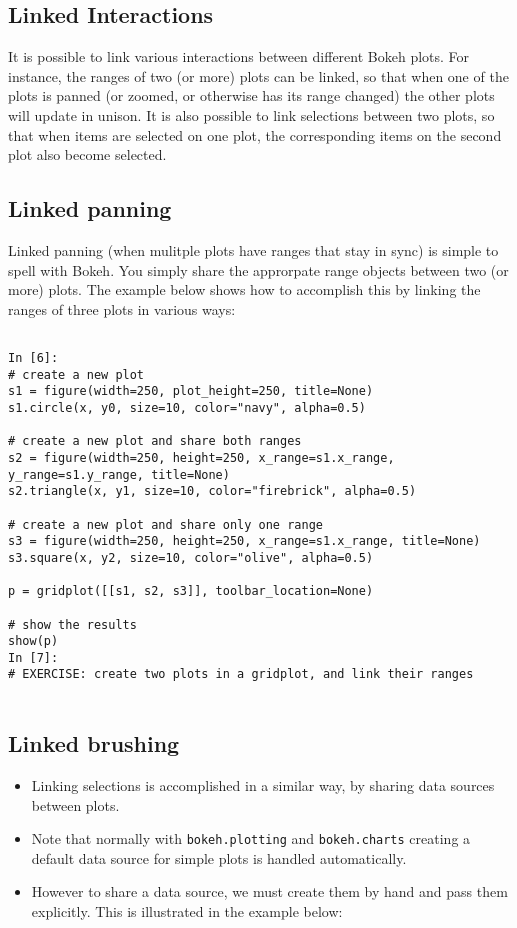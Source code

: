 \documentclass[a4paper,12pt]{article}
\begin{document}
\subsection{Linked Interactions}
It is possible to link various interactions between different Bokeh plots. For instance, the ranges of two (or more) plots can be linked, so that when one of the plots is panned (or zoomed, or otherwise has its range changed) the other plots will update in unison. It is also possible to link selections between two plots, so that when items are selected on one plot, the corresponding items on the second plot also become selected.

\subsection{Linked panning}
Linked panning (when mulitple plots have ranges that stay in sync) is simple to spell with Bokeh. You simply share the approrpate range objects between two (or more) plots. The example below shows how to accomplish this by linking the ranges of three plots in various ways:
\begin{framed}
	\begin{verbatim}
	
In [6]:
# create a new plot
s1 = figure(width=250, plot_height=250, title=None)
s1.circle(x, y0, size=10, color="navy", alpha=0.5)

# create a new plot and share both ranges
s2 = figure(width=250, height=250, x_range=s1.x_range, y_range=s1.y_range, title=None)
s2.triangle(x, y1, size=10, color="firebrick", alpha=0.5)

# create a new plot and share only one range
s3 = figure(width=250, height=250, x_range=s1.x_range, title=None)
s3.square(x, y2, size=10, color="olive", alpha=0.5)

p = gridplot([[s1, s2, s3]], toolbar_location=None)

# show the results
show(p)
In [7]:
# EXERCISE: create two plots in a gridplot, and link their ranges
	
\end{verbatim}
\end{framed}

\subsection{Linked brushing}
\begin{itemize}
\item Linking selections is accomplished in a similar way, by sharing data sources between plots. 
\item Note that normally with \texttt{bokeh.plotting} and \texttt{bokeh.charts} creating a default data source for simple plots is handled automatically. 
\item However to share a data source, we must create them by hand and pass them explicitly. This is illustrated in the example below:
\end{itemize}
\end{document}
